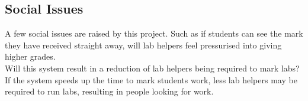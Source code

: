 \documentclass[12pt]{article}  %
\begin{document}
\subsection{Social Issues}
A few social issues are raised by this project. Such as if students can see the mark they have received straight away, will lab helpers feel pressurised into giving higher grades.\\
Will this system result in a reduction of lab helpers being required to mark labs? If the system speeds up the time to mark students work, less lab helpers may be required to run labs, resulting in people looking for work.







\newpage
\printbibliography[heading=bibintoc]
\let\cleardoublepage\clearpage



\end{document}
